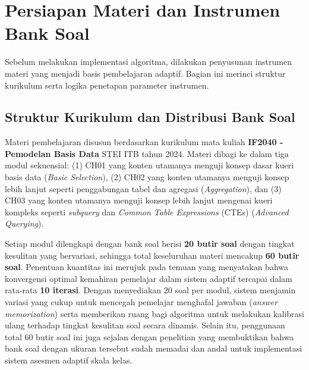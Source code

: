 \section{Persiapan Materi dan Instrumen Bank Soal}
\label{sec:persiapan_materi}

Sebelum melakukan implementasi algoritma, dilakukan penyusunan instrumen materi yang menjadi basis pembelajaran adaptif. Bagian ini merinci struktur kurikulum serta logika penetapan parameter instrumen.

\subsection{Struktur Kurikulum dan Distribusi Bank Soal}
Materi pembelajaran disusun berdasarkan kurikulum mata kuliah \textbf{IF2040 - Pemodelan Basis Data} STEI ITB tahun 2024. Materi dibagi ke dalam tiga modul sekuensial: (1) CH01 yang konten utamanya menguji konsep dasar kueri basis data (\textit{Basic Selection}), (2) CH02 yang konten utamanya menguji konsep lebih lanjut seperti penggabungan tabel dan agregasi (\textit{Aggregation}), dan (3) CH03 yang konten utamanya menguji konsep lebih lanjut mengenai kueri kompleks seperti \textit{subquery} dan \textit{Common Table Expressions} (CTEs) (\textit{Advanced Querying}).

Setiap modul dilengkapi dengan bank soal berisi \textbf{20 butir soal} dengan tingkat kesulitan yang bervariasi, sehingga total keseluruhan materi mencakup \textbf{60 butir soal}. Penentuan kuantitas ini merujuk pada temuan \textcite{Vesin2022} yang menyatakan bahwa konvergensi optimal kemahiran pemelajar dalam sistem adaptif tercapai dalam rata-rata \textbf{10 iterasi}. Dengan menyediakan 20 soal per modul, sistem menjamin variasi yang cukup untuk mencegah pemelajar menghafal jawaban (\textit{answer memorization}) serta memberikan ruang bagi algoritma untuk melakukan kalibrasi ulang terhadap tingkat kesulitan soal secara dinamis. Selain itu, penggunaan total 60 butir soal ini juga sejalan dengan penelitian \textcite{Hadi2022} yang membuktikan bahwa bank soal dengan ukuran tersebut sudah memadai dan andal untuk implementasi sistem asesmen adaptif skala kelas.

